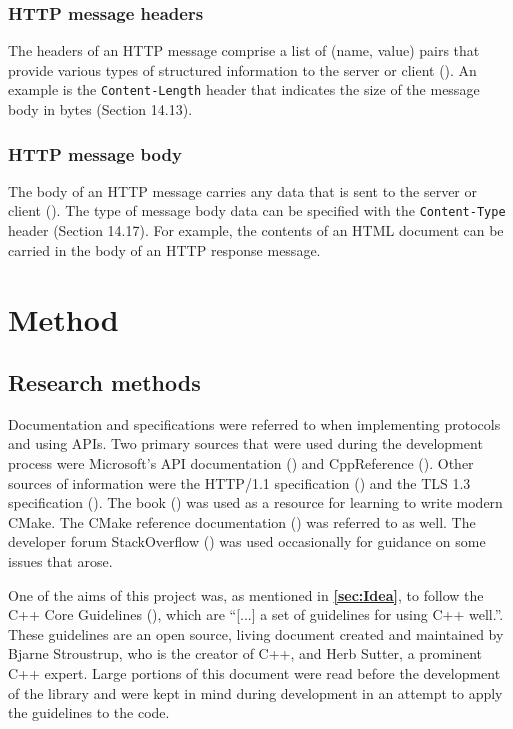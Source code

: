 \documentclass[12pt, a4paper]{article}
\begin{document}
\subsubsection{HTTP message headers}
The headers of an HTTP message comprise a list of (name, value) pairs that provide various types of structured information to the server or client (\cite[][Section 4.2]{HttpSpec}). An example is the \texttt{Content-Length} header that indicates the size of the message body in bytes (Section 14.13).

\subsubsection{HTTP message body}
The body of an HTTP message carries any data that is sent to the server or client (\cite[][Section 4.3]{HttpSpec}). The type of message body data can be specified with the \texttt{Content-Type} header (Section 14.17). For example, the contents of an HTML document can be carried in the body of an HTTP response message.

\clearpage
\section{Method}
\subsection{Research methods}
Documentation and specifications were referred to when implementing protocols and using APIs. Two primary sources that were used during the development process were Microsoft’s API documentation (\cite{MicrosoftDocs}) and CppReference (\cite{CppReference}). Other sources of information were the HTTP/1.1 specification (\cite{HttpSpec}) and the TLS 1.3 specification (\cite{TlsSpec}). The book  (\cite{ModernCMakeBook}) was used as a resource for learning to write modern CMake. The CMake reference documentation (\cite{CMakeReference}) was referred to as well. The developer forum StackOverflow (\cite{StackOverflow}) was used occasionally for guidance on some issues that arose. 

One of the aims of this project was, as mentioned in \textbf{\ref{sec:Idea}}, to follow the C++ Core Guidelines (\cite{CppCoreGuidelines}), which are “[...] a set of guidelines for using C++ well.”. These guidelines are an open source, living document created and maintained by Bjarne Stroustrup, who is the creator of C++, and Herb Sutter, a prominent C++ expert. Large portions of this document were read before the development of the library and were kept in mind during development in an attempt to apply the guidelines to the code.
\end{document}
